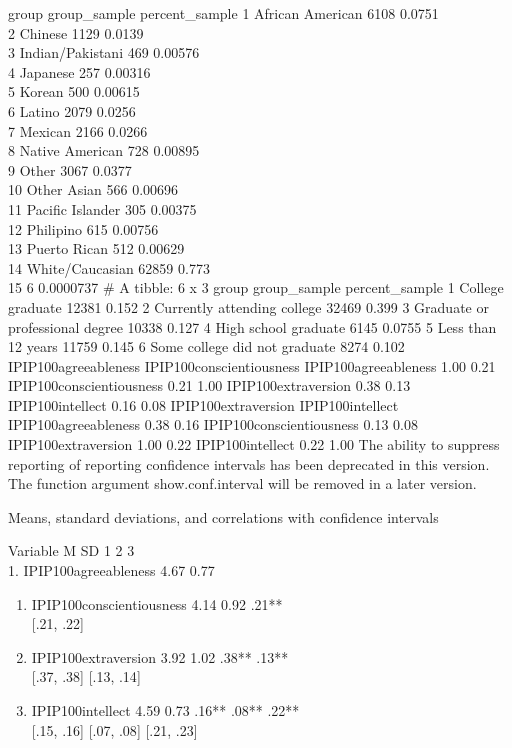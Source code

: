 \documentclass[
  english,
  man]{apa6}
\begin{document}
group group\_sample percent\_sample
1 African American 6108 0.0751\\
2 Chinese 1129 0.0139\\
3 Indian/Pakistani 469 0.00576\\
4 Japanese 257 0.00316\\
5 Korean 500 0.00615\\
6 Latino 2079 0.0256\\
7 Mexican 2166 0.0266\\
8 Native American 728 0.00895\\
9 Other 3067 0.0377\\
10 Other Asian 566 0.00696\\
11 Pacific Islander 305 0.00375\\
12 Philipino 615 0.00756\\
13 Puerto Rican 512 0.00629\\
14 White/Caucasian 62859 0.773\\
15 6 0.0000737
\# A tibble: 6 x 3
group group\_sample percent\_sample
1 College graduate 12381 0.152
2 Currently attending college 32469 0.399
3 Graduate or professional degree 10338 0.127
4 High school graduate 6145 0.0755
5 Less than 12 years 11759 0.145
6 Some college did not graduate 8274 0.102
IPIP100agreeableness IPIP100conscientiousness
IPIP100agreeableness 1.00 0.21
IPIP100conscientiousness 0.21 1.00
IPIP100extraversion 0.38 0.13
IPIP100intellect 0.16 0.08
IPIP100extraversion IPIP100intellect
IPIP100agreeableness 0.38 0.16
IPIP100conscientiousness 0.13 0.08
IPIP100extraversion 1.00 0.22
IPIP100intellect 0.22 1.00
The ability to suppress reporting of reporting confidence intervals has been deprecated in this version.
The function argument show.conf.interval will be removed in a later version.

Means, standard deviations, and correlations with confidence intervals

Variable M SD 1 2 3\\
1. IPIP100agreeableness 4.67 0.77

\begin{enumerate}
\def\labelenumi{\arabic{enumi}.}
\setcounter{enumi}{1}
\item
  IPIP100conscientiousness 4.14 0.92 .21**\\
  {[}.21, .22{]}
\item
  IPIP100extraversion 3.92 1.02 .38** .13**\\
  {[}.37, .38{]} {[}.13, .14{]}
\item
  IPIP100intellect 4.59 0.73 .16** .08** .22**\\
  {[}.15, .16{]} {[}.07, .08{]} {[}.21, .23{]}
\end{enumerate}
\end{document}
